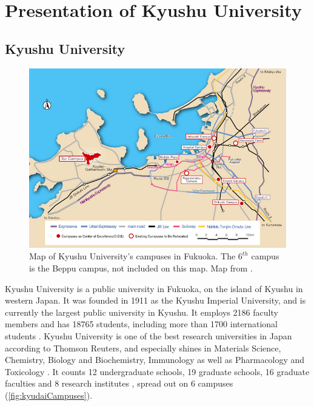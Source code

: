 \chapter{Presentation of Kyushu University}
\section{Kyushu University}
\begin{figure}[htb!]
\includegraphics[width=\textwidth]{images/campusesMap.jpg}
\caption{Map of Kyushu University's campuses in Fukuoka. The $6^{th}$ campus is the Beppu campus, not included on this map. Map from \cite{greenAsia} .}
\label{fig:kyudaiCampuses}
\end{figure}

Kyushu University is a public university in Fukuoka, on the island of Kyushu in western Japan. It was founded in 1911 as the Kyushu Imperial University, and is currently the largest public university in Kyushu. It employs 2186 faculty members and has 18765 students, including more than 1700 international students \cite{kyushuWebsiteHistory}. Kyushu University is one of the best research universities in Japan according to Thomson Reuters, and especially shines in Materials Science, Chemistry, Biology and Biochemistry, Immunology as well as Pharmacology and Toxicology \cite{reutersResearchRanking}. It counts 12 undergraduate schools, 19 graduate schools, 16 graduate faculties and 8 research institutes \cite{kyushuWebsiteFaculties}, spread out on 6 campuses (\autoref{fig:kyudaiCampuses}).

